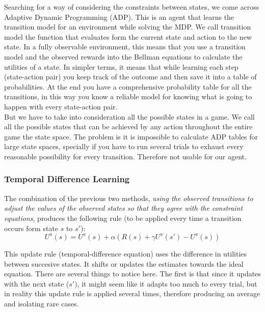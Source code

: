 Searching for a way of considering the constraints between states, we come across Adaptive Dynamic Programming (ADP). This is an agent that learns the transition model for an environment while solving the MDP. We call transition model the function that evaluates form the current state and action to the new state. In a fully observable environment, this means that you use a transition model and the observed rewards into the Bellman equations to calculate the utilities of a state. In simpler terms, it means that while learning each step (state-action pair) you keep track of the outcome and then save it into a table of probabilities. At the end you have a comprehensive probability table for all the transitions, in this way you know a reliable model for knowing what is going to happen with every state-action pair\cite{rl}.\\


But we have to take into consideration all the possible states in a game. We call all the possible states that can be achieved by any action throughout the entire game the state space. The problem is it is impossible to calculate ADP tables for large state spaces, specially if you have to run several trials to exhaust every reasonable possibility for every transition. Therefore not usable for our agent. \\


\subsubsection{Temporal Difference Learning} \label{TDE}

The combination of the previous two methods, \textit{using the observed transitions to adjust the values of the observed states so that they agree with the constraint equations}\cite[p767]{rl}, produces the following rule (to be applied every time a transition occurs form state $s$ to $s'$):\\

\begin{equation}
U^\pi(s) = U^\pi(s) + \alpha(R(s)+\gamma U^\pi(s') -  U^\pi(s))
\end{equation}

This update rule (temporal-difference equation) uses the difference in utilities between succesive states. It shifts or updates the estimates towards the ideal equation. There are several things to notice here. The first is that since it updates with the next state ($s'$), it might seem like it adapts too much to every trial, but in reality this update rule is applied several times, therefore producing an average and isolating rare cases. \cite{rl} \\

